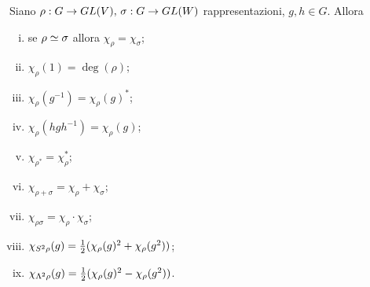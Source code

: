 \begin{proposition}
Siano $\rho:G\to GL(V),\,\allowbreak\sigma:G\to GL(W)$ rappresentazioni, $g,h\in G$. Allora
\begin{enumerate}[(i)]
\item se $\rho\simeq\sigma$ allora $\chi_\rho=\chi_\sigma$;
\item $\chi_\rho(1)=\deg(\rho)$;
\item $\chi_\rho(g^{-1})=\chi_\rho(g)^*$;
\item $\chi_\rho(hgh^{-1})=\chi_\rho(g)$;
\item $\chi_{\rho^*}=\chi_\rho^*$;
\item $\chi_{\rho+\sigma}=\chi_\rho+\chi_\sigma$;
\item $\chi_{\rho\sigma}=\chi_\rho\cdot\chi_\sigma$;
\item $\chi_{S^2\rho}(g)=\frac{1}{2}(\chi_\rho(g)^2+\chi_\rho(g^2))$;
\item $\chi_{\Lambda^2\rho}(g)=\frac{1}{2}(\chi_\rho(g)^2-\chi_\rho(g^2))$.
\end{enumerate}
\end{proposition}
